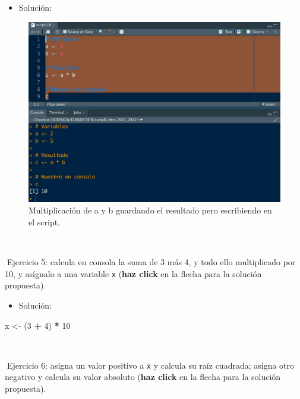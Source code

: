 \documentclass[11pt,]{book}
\newenvironment{Shaded}{\begin{snugshade}}{\end{snugshade}}
\newcommand{\DecValTok}[1]{\textcolor[rgb]{0.06,0.06,0.06}{#1}}
\newcommand{\NormalTok}[1]{#1}
\newcommand{\OperatorTok}[1]{\textcolor[rgb]{0.43,0.43,0.43}{\textbf{#1}}}
\newcommand{\StringTok}[1]{\textcolor[rgb]{0.5,0.5,0.5}{#1}}
\providecommand{\tightlist}{%
  \setlength{\itemsep}{0pt}\setlength{\parskip}{0pt}}
\begin{document}
\begin{itemize}
\tightlist
\item
  Solución:
\end{itemize}

\begin{figure}

{\centering \includegraphics[width=0.8\linewidth]{./img/consola_multiplicacion_3} 

}

\caption{Multiplicación de a y b guardando el resultado pero escribiendo en el script.}\label{fig:consola-multi-3}
\end{figure}

~

📝Ejercicio 5: calcula en consola la suma de 3 más 4, y todo ello multiplicado por 10, y asígnalo a una variable \texttt{x} (\textbf{haz click} en la flecha para la solución propuesta).

\begin{itemize}
\tightlist
\item
  Solución:
\end{itemize}

\begin{Shaded}
\begin{Highlighting}[]
\NormalTok{x <-}\StringTok{ }\NormalTok{(}\DecValTok{3} \OperatorTok{+}\StringTok{ }\DecValTok{4}\NormalTok{) }\OperatorTok{*}\StringTok{ }\DecValTok{10}
\end{Highlighting}
\end{Shaded}

~

📝Ejercicio 6: asigna un valor positivo a \texttt{x} y calcula su raíz cuadrada; asigna otro negativo y calcula su valor absoluto (\textbf{haz click} en la flecha para la solución propuesta).
\end{document}
